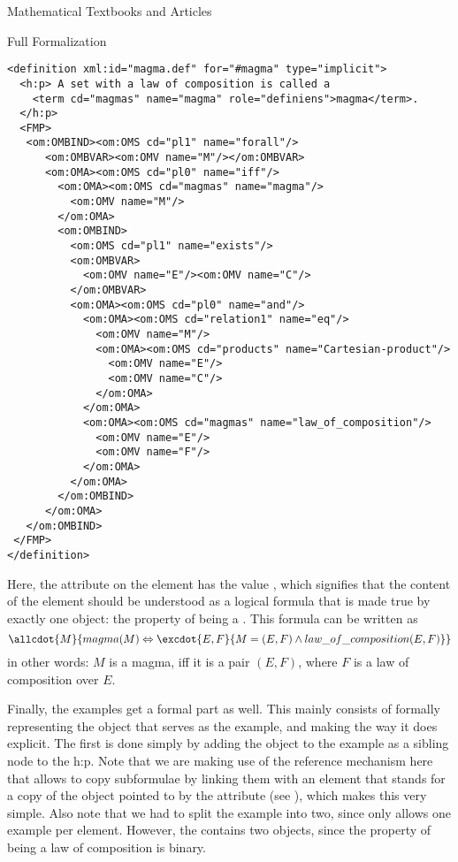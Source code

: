 \begin{omgroup}[short=Textbooks and Articles,id=algebra]{Mathematical Textbooks and Articles}
\begin{omgroup}[id=algebra.formalization]{Full Formalization}
\begin{lstlisting}[label=lst:magma:formal,
    caption={The formal definition of a magma},
    index={definition,h:p,FMP,OMS,OMA,OMV}]
 <definition xml:id="magma.def" for="#magma" type="implicit">
  <h:p> A set with a law of composition is called a 
    <term cd="magmas" name="magma" role="definiens">magma</term>.
  </h:p>
  <FMP>
   <om:OMBIND><om:OMS cd="pl1" name="forall"/>
      <om:OMBVAR><om:OMV name="M"/></om:OMBVAR>
      <om:OMA><om:OMS cd="pl0" name="iff"/>
        <om:OMA><om:OMS cd="magmas" name="magma"/>
          <om:OMV name="M"/>
        </om:OMA>
        <om:OMBIND>
          <om:OMS cd="pl1" name="exists"/>
          <om:OMBVAR>
            <om:OMV name="E"/><om:OMV name="C"/>
          </om:OMBVAR>
          <om:OMA><om:OMS cd="pl0" name="and"/>
            <om:OMA><om:OMS cd="relation1" name="eq"/>
              <om:OMV name="M"/>
              <om:OMA><om:OMS cd="products" name="Cartesian-product"/>
                <om:OMV name="E"/>
                <om:OMV name="C"/>
              </om:OMA>
            </om:OMA>
            <om:OMA><om:OMS cd="magmas" name="law_of_composition"/>
              <om:OMV name="E"/>
              <om:OMV name="F"/>
            </om:OMA>
          </om:OMA>
        </om:OMBIND>
      </om:OMA>
   </om:OMBIND>
 </FMP>
</definition>
\end{lstlisting}

\noindent Here, the {} attribute on the
{} element has the value
{}, which signifies that the
content of the {} element should be understood as a
logical formula that is made true by exactly one object: the
property of being a {}. This formula can be written
as
\[\allcdot{M}{magma(M)\Leftrightarrow\excdot{E,F}{M=(E,F)\land law\_of\_composition(E,F)}}\]
in other words: $M$ is a magma, iff it is a pair $(E,F)$, where $F$ is a law of
composition over $E$.

Finally, the examples get a formal part as well. This mainly consists of formally
representing the object that serves as the example, and making the way it does
explicit. The first is done simply by adding the object to the example as a
sibling node to the h:p. Note that we are making use of the {\openmath} reference
mechanism here that allows to copy subformulae by linking them with an
{} element that stands for a copy of the object pointed to by the
{} attribute (see {}), which makes
this very simple. Also note that we had to split the example into two, since
{\omdoc} only allows one example per {} element. However, the
{} contains two {\openmath} objects, since the property of
being a law of composition is binary. 


\end{omgroup}
\end{omgroup}
